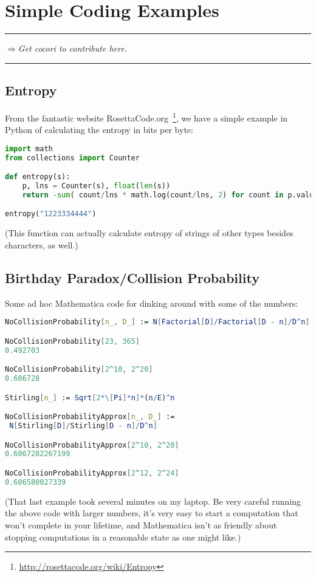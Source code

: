 \documentclass[%
 aip,
 jmp,%
 amsmath,amssymb,
 reprint,%
]{revtex4-1}
\def\outlinecomment#1{\hrule{\color{Blue}$\Rightarrow${\small\em #1}}\hrule}
\begin{document}


\section{Simple Coding Examples}

\outlinecomment{Get cocori to contribute here.}

\subsection{Entropy}

From the fantastic website
RosettaCode.org~\footnote{\url{http://rosettacode.org/wiki/Entropy}},
we have a simple example in Python of calculating the entropy in bits
per byte:

\begin{lstlisting}[language=Python]
import math
from collections import Counter

def entropy(s):
    p, lns = Counter(s), float(len(s))
    return -sum( count/lns * math.log(count/lns, 2) for count in p.values())

entropy("1223334444")
\end{lstlisting}

(This function can actually calculate entropy of strings of other
types besides characters, as well.)

\subsection{Birthday Paradox/Collision Probability}

Some ad hoc Mathematica code for dinking around with some of the
numbers:

\begin{lstlisting}[language=Mathematica]
NoCollisionProbability[n_, D_] := N[Factorial[D]/Factorial[D - n]/D^n]

NoCollisionProbability[23, 365]
0.492703

NoCollisionProbability[2^10, 2^20]
0.606728

Stirling[n_] := Sqrt[2*\[Pi]*n]*(n/E)^n

NoCollisionProbabilityApprox[n_, D_] := 
 N[Stirling[D]/Stirling[D - n]/D^n]

NoCollisionProbabilityApprox[2^10, 2^20]
0.6067282267199

NoCollisionProbabilityApprox[2^12, 2^24]
0.606580027339
\end{lstlisting}
(That last example took several minutes on my laptop.  Be very careful
running the above code with larger numbers, it's very easy to start a
computation that won't complete in your lifetime, and Mathematica
isn't as friendly about stopping computations in a reasonable state as
one might like.)
\end{document}
